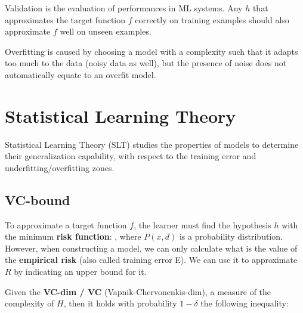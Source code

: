 Validation is the evaluation of performances in ML systems. Any $h$ that approximates the target function $f$ correctly on training examples should also approximate $f$ well on unseen examples.


\begin{center}
    \vspace{5mm}
    \vspace{5mm}
\end{center}

Overfitting is caused by choosing a model with a complexity such that it adapts too much to the data (noisy data as well), but the presence of noise does not automatically equate to an overfit model.


\section{Statistical Learning Theory}

Statistical Learning Theory (SLT) studies the properties of models to determine their generalization capability, with respect to the training error and underfitting/overfitting zones.

\subsection{VC-bound}

To approximate a target function $f$, the learner must find the hypothesis $h$ with the minimum \textbf{risk function}: , where $P(x,d)$ is a probability distribution. However, when constructing a model, we can only calculate what is the value of the \textbf{empirical risk}  (also called training error E). We can use it to approximate $R$ by indicating an upper bound for it.

Given the \textbf{VC-dim / VC} (Vapnik-Chervonenkis-dim), a measure of the complexity of $H$, then it holds with probability $1-\delta$ the following inequality:

